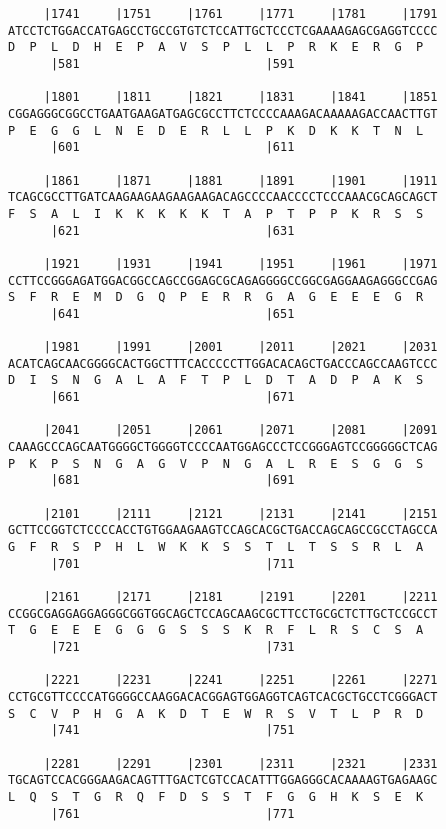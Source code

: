 \documentclass{article}
\begin{document}
\begin{Verbatim}
     |1741     |1751     |1761     |1771     |1781     |1791
ATCCTCTGGACCATGAGCCTGCCGTGTCTCCATTGCTCCCTCGAAAAGAGCGAGGTCCCC
D  P  L  D  H  E  P  A  V  S  P  L  L  P  R  K  E  R  G  P  
      |581                          |591                    
  
     |1801     |1811     |1821     |1831     |1841     |1851
CGGAGGGCGGCCTGAATGAAGATGAGCGCCTTCTCCCCAAAGACAAAAAGACCAACTTGT
P  E  G  G  L  N  E  D  E  R  L  L  P  K  D  K  K  T  N  L  
      |601                          |611                    
  
     |1861     |1871     |1881     |1891     |1901     |1911
TCAGCGCCTTGATCAAGAAGAAGAAGAAGACAGCCCCAACCCCTCCCAAACGCAGCAGCT
F  S  A  L  I  K  K  K  K  K  T  A  P  T  P  P  K  R  S  S  
      |621                          |631                    
  
     |1921     |1931     |1941     |1951     |1961     |1971
CCTTCCGGGAGATGGACGGCCAGCCGGAGCGCAGAGGGGCCGGCGAGGAAGAGGGCCGAG
S  F  R  E  M  D  G  Q  P  E  R  R  G  A  G  E  E  E  G  R  
      |641                          |651                    
  
     |1981     |1991     |2001     |2011     |2021     |2031
ACATCAGCAACGGGGCACTGGCTTTCACCCCCTTGGACACAGCTGACCCAGCCAAGTCCC
D  I  S  N  G  A  L  A  F  T  P  L  D  T  A  D  P  A  K  S  
      |661                          |671                    
  
     |2041     |2051     |2061     |2071     |2081     |2091
CAAAGCCCAGCAATGGGGCTGGGGTCCCCAATGGAGCCCTCCGGGAGTCCGGGGGCTCAG
P  K  P  S  N  G  A  G  V  P  N  G  A  L  R  E  S  G  G  S  
      |681                          |691                    
  
     |2101     |2111     |2121     |2131     |2141     |2151
GCTTCCGGTCTCCCCACCTGTGGAAGAAGTCCAGCACGCTGACCAGCAGCCGCCTAGCCA
G  F  R  S  P  H  L  W  K  K  S  S  T  L  T  S  S  R  L  A  
      |701                          |711                    
  
     |2161     |2171     |2181     |2191     |2201     |2211
CCGGCGAGGAGGAGGGCGGTGGCAGCTCCAGCAAGCGCTTCCTGCGCTCTTGCTCCGCCT
T  G  E  E  E  G  G  G  S  S  S  K  R  F  L  R  S  C  S  A  
      |721                          |731                    
  
     |2221     |2231     |2241     |2251     |2261     |2271
CCTGCGTTCCCCATGGGGCCAAGGACACGGAGTGGAGGTCAGTCACGCTGCCTCGGGACT
S  C  V  P  H  G  A  K  D  T  E  W  R  S  V  T  L  P  R  D  
      |741                          |751                    
  
     |2281     |2291     |2301     |2311     |2321     |2331
TGCAGTCCACGGGAAGACAGTTTGACTCGTCCACATTTGGAGGGCACAAAAGTGAGAAGC
L  Q  S  T  G  R  Q  F  D  S  S  T  F  G  G  H  K  S  E  K  
      |761                          |771                    
  

\end{Verbatim}
\end{document}
